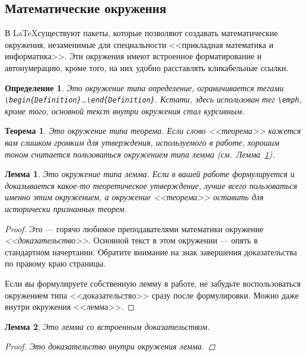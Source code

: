 \documentclass[14pt, russian]{scrartcl}
\newcounter{cTheorem}
\newcounter{cDefinition}
\newcounter{cLemma}
\newtheorem{Theorem}{Теорема}[cTheorem]
\newtheorem{Definition}{Определение}[cDefinition]
\newtheorem{Lemma}{Лемма}[cLemma]
\begin{document}
\subsection{Математические окружения}\label{Sect::MathEnv}

В \LaTeX существуют пакеты, которые позволяют создавать математические окружения, незаменимые для специальности <<прикладная математика и информатика>>. Эти окружения имеют встроенное форматирование и автонумерацию, кроме того, на них удобно расставлять кликабельные ссылки.

\begin{Definition}
Это окружение типа \emph{определение}, ограничивается тегами \texttt{\textbackslash begin\{Definition\}}\dots \texttt{\textbackslash end\{Definition\}}. Кстати, здесь использован тег \texttt{\textbackslash emph}, кроме того, основной текст внутри окружения стал курсивным.
\end{Definition} 

\begin{Theorem}
Это окружение типа \emph{теорема}. Если слово <<теорема>> кажется вам слишком громким для утверждения, используемого в работе, хорошим тоном считается пользоваться окружением типа лемма (см.~Лемма~\ref{Lemma::Lemma}).
\end{Theorem} 

\begin{Lemma}\label{Lemma::Lemma}
Это окружение типа \emph{лемма}. Если в вашей работе формулируется и доказывается какое-то теоретическое утверждение, лучше всего пользоваться именно этим окружением, а окружение <<теорема>> оставить для исторически признанных теорем.
\end{Lemma} 

\begin{proof}
Это --- горячо любимое преподавателями математики окружение \emph{<<доказательство>>}. Основной текст в этом окружении --- опять в стандартном начертании. Обратите внимание на знак завершения доказательства по правому краю страницы.

Если вы формулируете собственную лемму в работе, не забудьте воспользоваться окружением типа <<доказательство>> сразу после формулировки. Можно даже внутри окружения <<лемма>>.
\end{proof}

\begin{Lemma}
Это лемма со встроенным доказательством.
\begin{proof}
Это доказательство внутри окружения лемма.
\end{proof}
\end{Lemma} 
\end{document}
